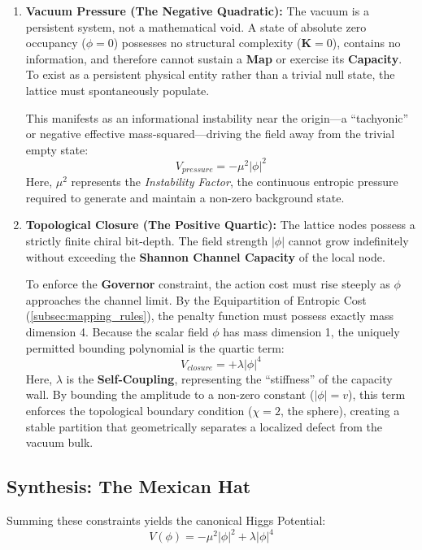 \begin{enumerate}
    \item \textbf{Vacuum Pressure (The Negative Quadratic):}
    The vacuum is a persistent system, not a mathematical void. A state of absolute zero occupancy ($\phi = 0$) possesses no structural complexity ($\mathbf{K}=0$), contains no information, and therefore cannot sustain a \textbf{Map} or exercise its \textbf{Capacity}. To exist as a persistent physical entity rather than a trivial null state, the lattice must spontaneously populate.
    
    This manifests as an informational instability near the origin—a ``tachyonic'' or negative effective mass-squared—driving the field away from the trivial empty state:
    \begin{equation}
        V_{pressure} = -\mu^2 |\phi|^2
    \end{equation}
    Here, $\mu^2$ represents the \textit{Instability Factor}, the continuous entropic pressure required to generate and maintain a non-zero background state.

    \item \textbf{Topological Closure (The Positive Quartic):}
    The lattice nodes possess a strictly finite chiral bit-depth. The field strength $|\phi|$ cannot grow indefinitely without exceeding the \textbf{Shannon Channel Capacity} of the local node.
    
    To enforce the \textbf{Governor} constraint, the action cost must rise steeply as $\phi$ approaches the channel limit. By the Equipartition of Entropic Cost (\cref{subsec:mapping_rules}), the penalty function must possess exactly mass dimension 4. Because the scalar field $\phi$ has mass dimension 1, the uniquely permitted bounding polynomial is the quartic term:
    \begin{equation}
        V_{closure} = +\lambda |\phi|^4
    \end{equation}
    Here, $\lambda$ is the \textbf{Self-Coupling}, representing the ``stiffness'' of the capacity wall. By bounding the amplitude to a non-zero constant ($|\phi| = v$), this term enforces the topological boundary condition ($\chi=2$, the sphere), creating a stable partition that geometrically separates a localized defect from the vacuum bulk.
\end{enumerate}

\subsection{Synthesis: The Mexican Hat}
Summing these constraints yields the canonical Higgs Potential:
\begin{equation}
    V(\phi) = -\mu^2|\phi|^2 + \lambda|\phi|^4
\end{equation}

